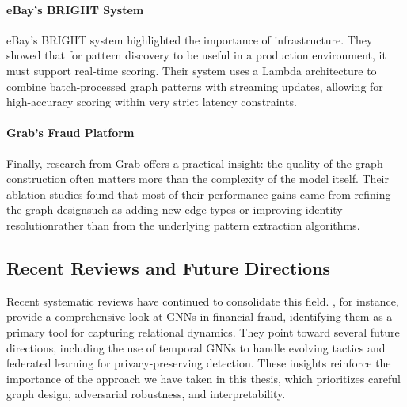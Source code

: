 \paragraph{eBay's BRIGHT System}
eBay's BRIGHT system \cite{ebay2022bright} highlighted the importance of infrastructure. They showed that for pattern discovery to be useful in a production environment, it must support real-time scoring. Their system uses a Lambda architecture to combine batch-processed graph patterns with streaming updates, allowing for high-accuracy scoring within very strict latency constraints.

\paragraph{Grab's Fraud Platform}
Finally, research from Grab \cite{khoo2024building} offers a practical insight: the quality of the graph construction often matters more than the complexity of the model itself. Their ablation studies found that most of their performance gains came from refining the graph designsuch as adding new edge types or improving identity resolutionrather than from the underlying pattern extraction algorithms.

\subsection{Recent Reviews and Future Directions}

Recent systematic reviews have continued to consolidate this field. \citeauthor{motie2024financial} \cite{motie2024financial}, for instance, provide a comprehensive look at GNNs in financial fraud, identifying them as a primary tool for capturing relational dynamics. They point toward several future directions, including the use of temporal GNNs to handle evolving tactics and federated learning for privacy-preserving detection. These insights reinforce the importance of the approach we have taken in this thesis, which prioritizes careful graph design, adversarial robustness, and interpretability.
